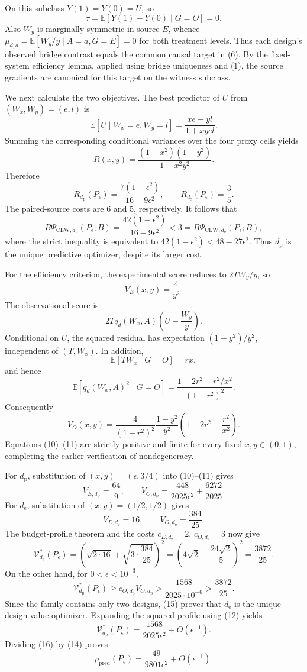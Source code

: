 On this subclass \(Y(1)=Y(0)=U\), so
\[
 \tau=\mathbb E[Y(1)-Y(0)\mid G=O]=0. \tag{6}
\]
Also \(W_y\) is marginally symmetric in source \(E\), whence \(\mu_{d,a}=\mathbb E[W_y/y\mid A=a,G=E]=0\) for both treatment levels.  Thus each design's observed bridge contrast equals the common causal target in (6).  By the fixed-system efficiency lemma, applied using bridge uniqueness and (1), the source gradients are canonical for this target on the witness subclass.

We next calculate the two objectives.  The best predictor of \(U\) from \((W_x,W_y)=(e,l)\) is
\[
 \mathbb E[U\mid W_x=e,W_y=l]
 =\frac{xe+yl}{1+xyel}.
\]
Summing the corresponding conditional variances over the four proxy cells yields
\[
 R(x,y)=\frac{(1-x^2)(1-y^2)}{1-x^2y^2}. \tag{7}
\]
Therefore
\[
 R_{d_{\mathrm p}}(P_\epsilon)
 =\frac{7(1-\epsilon^2)}{16-9\epsilon^2},
 \qquad
 R_{d_{\mathrm e}}(P_\epsilon)=\frac35. \tag{8}
\]
The paired-source costs are \(6\) and \(5\), respectively.  It follows that
\[
 B\Psi_{\mathrm{CLW},d_{\mathrm p}}(P_\epsilon;B)
 =\frac{42(1-\epsilon^2)}{16-9\epsilon^2}
 <3
 =B\Psi_{\mathrm{CLW},d_{\mathrm e}}(P_\epsilon;B), \tag{9}
\]
where the strict inequality is equivalent to
\(42(1-\epsilon^2)<48-27\epsilon^2\).  Thus \(d_{\mathrm p}\) is the unique predictive optimizer, despite its larger cost.

For the efficiency criterion, the experimental score reduces to \(2TW_y/y\), so
\[
 V_E(x,y)=\frac4{y^2}. \tag{10}
\]
The observational score is
\[
 2Tq_d(W_x,A)\left(U-\frac{W_y}{y}\right).
\]
Conditional on \(U\), the squared residual has expectation \((1-y^2)/y^2\), independent of \((T,W_x)\).  In addition,
\[
 \mathbb E[TW_x\mid G=O]=rx,
\]
and hence
\[
 \mathbb E[q_d(W_x,A)^2\mid G=O]
 =\frac{1-2r^2+r^2/x^2}{(1-r^2)^2}.
\]
Consequently
\[
 V_O(x,y)=
 \frac4{(1-r^2)^2}\frac{1-y^2}{y^2}
 \left(1-2r^2+\frac{r^2}{x^2}\right). \tag{11}
\]
Equations (10)--(11) are strictly positive and finite for every fixed \(x,y\in(0,1)\), completing the earlier verification of nondegeneracy.

For \(d_{\mathrm p}\), substitution of \((x,y)=(\epsilon,3/4)\) into (10)--(11) gives
\[
 V_{E,d_{\mathrm p}}=\frac{64}{9},
 \qquad
 V_{O,d_{\mathrm p}}
 =\frac{448}{2025\epsilon^2}+\frac{6272}{2025}. \tag{12}
\]
For \(d_{\mathrm e}\), substitution of \((x,y)=(1/2,1/2)\) gives
\[
 V_{E,d_{\mathrm e}}=16,
 \qquad
 V_{O,d_{\mathrm e}}=\frac{384}{25}. \tag{13}
\]
The budget-profile theorem and the costs \(c_{E,d_{\mathrm e}}=2\), \(c_{O,d_{\mathrm e}}=3\) now give
\[
 \mathcal V_{d_{\mathrm e}}^*(P_\epsilon)
 =\left(\sqrt{2\cdot16}+\sqrt{3\cdot\frac{384}{25}}\right)^2
 =\left(4\sqrt2+\frac{24\sqrt2}{5}\right)^2
 =\frac{3872}{25}. \tag{14}
\]
On the other hand, for \(0<\epsilon<10^{-3}\),
\[
 \mathcal V_{d_{\mathrm p}}^*(P_\epsilon)
 \ge c_{O,d_{\mathrm p}}V_{O,d_{\mathrm p}}
 >\frac{1568}{2025\cdot10^{-6}}
 >\frac{3872}{25}. \tag{15}
\]
Since the family contains only two designs, (15) proves that \(d_{\mathrm e}\) is the unique design-value optimizer.  Expanding the squared profile using (12) yields
\[
 \mathcal V_{d_{\mathrm p}}^*(P_\epsilon)
 =\frac{1568}{2025\epsilon^2}+O(\epsilon^{-1}). \tag{16}
\]
Dividing (16) by (14) proves
\[
 \rho_{\mathrm{pred}}(P_\epsilon)
 =\frac{49}{9801\epsilon^2}+O(\epsilon^{-1}). \tag{17}
\]

